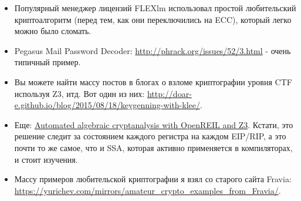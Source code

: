 \begin{itemize}

\item Популярный менеджер лицензий FLEXlm использовал простой любительский криптоалгоритм
(перед тем, как они переключились на \ac{ECC}), который легко можно было сломать.

\item Pegasus Mail Password Decoder: \url{http://phrack.org/issues/52/3.html} -
очень типичный пример.

\item Вы можете найти массу постов в блогах о взломе криптографии уровня \ac{CTF} используя Z3, итд.
Вот один из них: \url{http://doar-e.github.io/blog/2015/08/18/keygenning-with-klee/}.

\item Еще: \href{http://blog.cr4.sh/2015/03/automated-algebraic-cryptanalysis-with.html}{Automated algebraic cryptanalysis with OpenREIL and Z3}.
Кстати, это решение следит за состоянием каждого регистра на каждом EIP/RIP, а это почти то же самое, что и \ac{SSA},
которая активно применяется в компиляторах, и стоит изучения.

\item Массу примеров любительской криптографии я взял со старого сайта Fravia:
\url{https://yurichev.com/mirrors/amateur_crypto_examples_from_Fravia/}.

\end{itemize}



